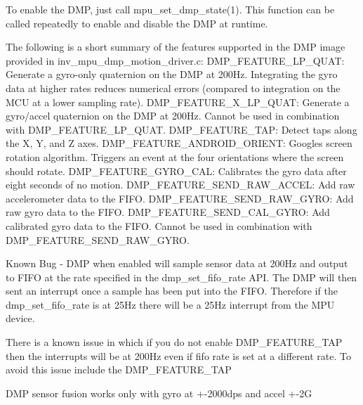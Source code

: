 To enable the D\+MP, just call mpu\+\_\+set\+\_\+dmp\+\_\+state(1). This function can be called repeatedly to enable and disable the D\+MP at runtime.

The following is a short summary of the features supported in the D\+MP image provided in inv\+\_\+mpu\+\_\+dmp\+\_\+motion\+\_\+driver.\+c\+: D\+M\+P\+\_\+\+F\+E\+A\+T\+U\+R\+E\+\_\+\+L\+P\+\_\+\+Q\+U\+AT\+: Generate a gyro-\/only quaternion on the D\+MP at 200\+Hz. Integrating the gyro data at higher rates reduces numerical errors (compared to integration on the M\+CU at a lower sampling rate). D\+M\+P\+\_\+\+F\+E\+A\+T\+U\+R\+E\+\_\+X\+\_\+\+L\+P\+\_\+\+Q\+U\+AT\+: Generate a gyro/accel quaternion on the D\+MP at 200\+Hz. Cannot be used in combination with D\+M\+P\+\_\+\+F\+E\+A\+T\+U\+R\+E\+\_\+\+L\+P\+\_\+\+Q\+U\+AT. D\+M\+P\+\_\+\+F\+E\+A\+T\+U\+R\+E\+\_\+\+T\+AP\+: Detect taps along the X, Y, and Z axes. D\+M\+P\+\_\+\+F\+E\+A\+T\+U\+R\+E\+\_\+\+A\+N\+D\+R\+O\+I\+D\+\_\+\+O\+R\+I\+E\+NT\+: Google\textquotesingle{}s screen rotation algorithm. Triggers an event at the four orientations where the screen should rotate. D\+M\+P\+\_\+\+F\+E\+A\+T\+U\+R\+E\+\_\+\+G\+Y\+R\+O\+\_\+\+C\+AL\+: Calibrates the gyro data after eight seconds of no motion. D\+M\+P\+\_\+\+F\+E\+A\+T\+U\+R\+E\+\_\+\+S\+E\+N\+D\+\_\+\+R\+A\+W\+\_\+\+A\+C\+C\+EL\+: Add raw accelerometer data to the F\+I\+FO. D\+M\+P\+\_\+\+F\+E\+A\+T\+U\+R\+E\+\_\+\+S\+E\+N\+D\+\_\+\+R\+A\+W\+\_\+\+G\+Y\+RO\+: Add raw gyro data to the F\+I\+FO. D\+M\+P\+\_\+\+F\+E\+A\+T\+U\+R\+E\+\_\+\+S\+E\+N\+D\+\_\+\+C\+A\+L\+\_\+\+G\+Y\+RO\+: Add calibrated gyro data to the F\+I\+FO. Cannot be used in combination with D\+M\+P\+\_\+\+F\+E\+A\+T\+U\+R\+E\+\_\+\+S\+E\+N\+D\+\_\+\+R\+A\+W\+\_\+\+G\+Y\+RO.

Known Bug -\/ D\+MP when enabled will sample sensor data at 200\+Hz and output to F\+I\+FO at the rate specified in the dmp\+\_\+set\+\_\+fifo\+\_\+rate A\+PI. The D\+MP will then sent an interrupt once a sample has been put into the F\+I\+FO. Therefore if the dmp\+\_\+set\+\_\+fifo\+\_\+rate is at 25\+Hz there will be a 25\+Hz interrupt from the M\+PU device.

There is a known issue in which if you do not enable D\+M\+P\+\_\+\+F\+E\+A\+T\+U\+R\+E\+\_\+\+T\+AP then the interrupts will be at 200\+Hz even if fifo rate is set at a different rate. To avoid this issue include the D\+M\+P\+\_\+\+F\+E\+A\+T\+U\+R\+E\+\_\+\+T\+AP

D\+MP sensor fusion works only with gyro at +-\/2000dps and accel +-\/2G

